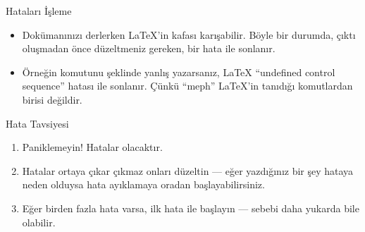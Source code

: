 \documentclass[aspectratio=169]{beamer}
\begin{document}
\begin{frame}[fragile]{Hataları İşleme}
\begin{itemize}
\item Dokümanınızı derlerken \LaTeX{}'in kafası karışabilir. Böyle bir durumda, çıktı oluşmadan önce düzeltmeniz gereken, bir hata ile sonlanır.
\item Örneğin  komutunu  şeklinde yanlış yazarsanız, \LaTeX{} ``undefined control sequence'' hatası ile sonlanır.
Çünkü ``meph'' \LaTeX{}'in tanıdığı komutlardan birisi değildir.
\end{itemize}
\begin{block}{Hata Tavsiyesi}
\begin{enumerate}
\item Paniklemeyin! Hatalar olacaktır.
\item Hatalar ortaya çıkar çıkmaz onları düzeltin --- eğer yazdığınız bir şey hataya neden olduysa hata ayıklamaya oradan başlayabilirsiniz.
\item Eğer birden fazla hata varsa, ilk hata ile başlayın --- sebebi daha yukarda bile olabilir. 
\end{enumerate}
\end{block}
\end{frame}

\end{document}

